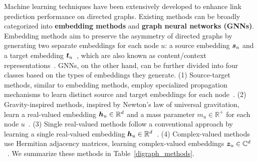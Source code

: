Machine learning techniques have been extensively developed to enhance link prediction performance on directed graphs. Existing methods can be broadly categorized into \textbf{embedding methods}
and \textbf{graph neural networks (GNNs)}. Embedding methods aim to preserve the asymmetry of directed graphs by generating two separate embeddings for each node $u$: a source embedding ${\bm{s}}_u$ and a target embedding ${\bm{t}}_u$~\cite{eltra,odin}, which are also known as content/context representations~\cite{hope,strap}. GNNs, on the other hand, can be further divided into four classes based on the types of embeddings they generate. (1) Source-target methods, similar to embedding methods, employ specialized propagation mechanisms to learn distinct source and target embeddings for each node~\cite{digae,coba}. (2) Gravity-inspired methods, inspired by Newton's law of universal gravitation, learn a real-valued embedding
${\bm{h}}_u \in \mathbb{R}^d$ and a mass parameter $m_u \in \mathbb{R}^{+}$ for each node $u$~\cite{gragae,dhypr}. 
(3) Single real-valued methods follow a conventional approach by learning a single real-valued embedding ${\bm{h}}_u \in \mathbb{R}^d$~\cite{dirgnn,nddgnn}.
(4) Complex-valued methods use Hermitian adjacency matrices, learning complex-valued embeddings ${\bm{z}}_u \in \mathbb{C}^d$~\cite{magnet,duplex}.
We summarize these methods in Table~\ref{digraph_methods}.





